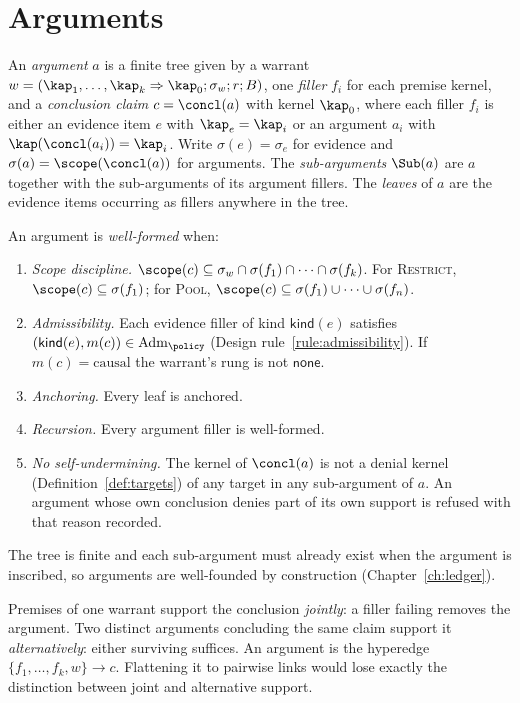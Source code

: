 \section{Arguments}

\begin{definition}[Argument]\label{def:argument}
An \emph{argument} $a$ is a finite tree given by a warrant $w=(\kap_1,\dots,\kap_k\Rightarrow\kap_0;\sigma_w;r;B)$, one \emph{filler} $f_i$ for each premise kernel, and a \emph{conclusion claim} $c=\concl(a)$ with kernel $\kap_0$, where each filler $f_i$ is either an evidence item $e$ with $\kap_e=\kap_i$ or an argument $a_i$ with $\kap(\concl(a_i))=\kap_i$. Write $\sigma(e)=\sigma_e$ for evidence and $\sigma(a)=\scope(\concl(a))$ for arguments. The \emph{sub-arguments} $\Sub(a)$ are $a$ together with the sub-arguments of its argument fillers. The \emph{leaves} of $a$ are the evidence items occurring as fillers anywhere in the tree.
\end{definition}

An argument is \emph{well-formed} when:
\begin{enumerate}[label=(W\arabic*)]
\item \emph{Scope discipline.} $\scope(c)\subseteq\sigma_w\cap\sigma(f_1)\cap\dots\cap\sigma(f_k)$. For \textsc{Restrict}, $\scope(c)\subseteq\sigma(f_1)$; for \textsc{Pool}, $\scope(c)\subseteq\sigma(f_1)\cup\dots\cup\sigma(f_n)$.
\item \emph{Admissibility.} Each evidence filler of kind $\mathsf{kind}(e)$ satisfies $(\mathsf{kind}(e),m(c))\in\mathrm{Adm}_\policy$ (Design rule~\ref{rule:admissibility}). If $m(c)=\text{causal}$ the warrant's rung is not $\mathsf{none}$.
\item \emph{Anchoring.} Every leaf is anchored.
\item \emph{Recursion.} Every argument filler is well-formed.
\item \emph{No self-undermining.} The kernel of $\concl(a)$ is not a denial kernel (Definition~\ref{def:targets}) of any target in any sub-argument of $a$. An argument whose own conclusion denies part of its own support is refused with that reason recorded.
\end{enumerate}
The tree is finite and each sub-argument must already exist when the argument is inscribed, so arguments are well-founded by construction (Chapter~\ref{ch:ledger}).

\begin{remark}
Premises of one warrant support the conclusion \emph{jointly}: a filler failing removes the argument. Two distinct arguments concluding the same claim support it \emph{alternatively}: either surviving suffices. An argument is the hyperedge $\{f_1,\dots,f_k,w\}\to c$. Flattening it to pairwise links would lose exactly the distinction between joint and alternative support.
\end{remark}

